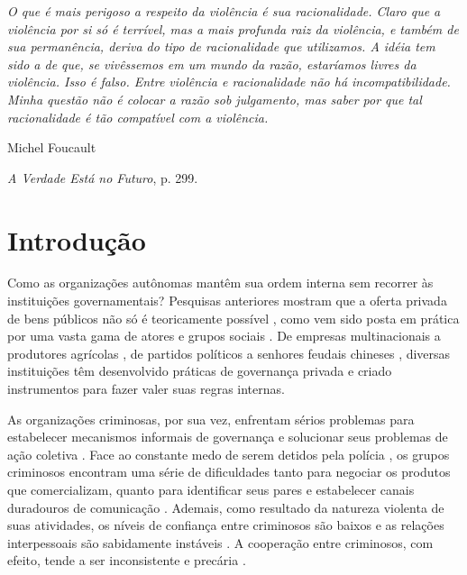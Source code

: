 \documentclass[a4paper,11pt]{article}
\newcommand\bookepigraph[4]{
\vspace{1em}\hfill{}\begin{minipage}{#1}{\begin{spacing}{0.9}
\small\noindent\textit{#2}\end{spacing}
\vspace{2em}
\hfill{}{#3}\small\\
\vspace{-2em}\begin{flushright}{#4}\end{flushright}}\vspace{1em}
\end{minipage}}
\begin{document}
\newpage

\bookepigraph{3.75in}{O que é mais perigoso a respeito da violência é sua racionalidade. Claro que a violência por si só é terrível, mas a mais profunda raiz da violência, e também de sua permanência, deriva do tipo de racionalidade que utilizamos. A idéia tem sido a de que, se vivêssemos em um mundo da razão, estaríamos livres da violência. Isso é falso. Entre violência e racionalidade não há incompatibilidade. Minha questão não é colocar a razão sob julgamento, mas saber por que tal racionalidade é tão compatível com a violência.}{Michel Foucault}{\textit{A Verdade Está no Futuro}, p. 299.}

\section{Introdução}
\onehalfspacing

Como as organizações autônomas mantêm sua ordem interna sem recorrer às instituições governamentais? Pesquisas anteriores mostram que a oferta privada de bens públicos não só é teoricamente possível \citep{bergstrom1986private, hayek1960constitution, hayek1988fatal, olson1965logic}, como vem sido posta em prática por uma vasta gama de atores e grupos sociais \citep{baldassarri2009collective}. De empresas multinacionais \citep[25]{ostrom1990governing} a produtores agrícolas \citep{schepel2005constitution}, de partidos políticos \citep[729]{helmke2003informal} a senhores feudais chineses \citep{jackson2003warlords}, diversas instituições têm desenvolvido práticas de governança privada e criado instrumentos para fazer valer suas regras internas.

As organizações criminosas, por sua vez, enfrentam sérios problemas para estabelecer mecanismos informais de governança e solucionar seus problemas de ação coletiva \citep{sheptycki2003governance}. Face ao constante medo de serem detidos pela polícia \citep{williams2002cooperation}, os grupos criminosos encontram uma série de dificuldades tanto para negociar os produtos que comercializam, quanto para identificar seus pares e estabelecer canais duradouros de comunicação \citep[xii]{gambetta2009codes}. Ademais, como resultado da natureza violenta de suas atividades, os níveis de confiança entre criminosos são baixos e as relações interpessoais são sabidamente instáveis \citep{liebling2012social, von2004organized}. A cooperação entre criminosos, com efeito, tende a ser inconsistente e precária \citep{morselli2007efficiency}.
\end{document}
